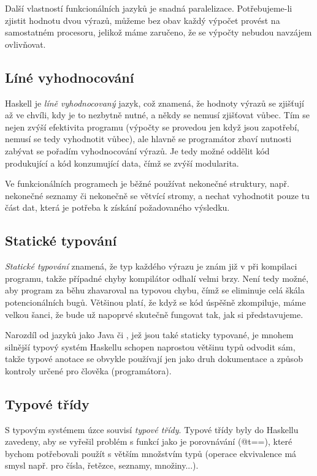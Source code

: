 Další vlastností funkcionálních jazyků je snadná paralelizace. Potřebujeme-li
zjistit hodnotu dvou výrazů, můžeme bez obav každý výpočet provést na
samostatném procesoru, jelikož máme zaručeno, že se výpočty nebudou navzájem
ovlivňovat.

\subsection{Líné vyhodnocování}

Haskell je \emph{líně vyhodnocovaný} jazyk, což znamená, že hodnoty výrazů se
zjišťují až ve chvíli, kdy je to nezbytně nutné, a někdy se nemusí zjišťovat
vůbec. Tím se nejen zvýší efektivita programu (výpočty se provedou jen když jsou
zapotřebí, nemusí se tedy vyhodnotit vůbec), ale hlavně se programátor zbaví
nutnosti zabývat se pořadím vyhodnocování výrazů. Je tedy možné oddělit kód
produkující a kód konzumující data, čímž se zvýší modularita. \cite{hughes1989functional}

Ve funkcionálních programech je běžné používat nekonečné struktury, např.
nekonečné seznamy či nekonečně se větvící stromy, a nechat vyhodnotit pouze tu
část dat, která je potřeba k získání požadovaného výsledku.

\subsection{Statické typování}

\emph{Statické typování} znamená, že typ každého výrazu je znám již v při
kompilaci programu, takže případné chyby kompilátor odhalí velmi brzy. Není tedy
možné, aby program za běhu zhavaroval na typovou chybu, čímž se eliminuje celá
škála potencionálních bugů. Většinou platí, že když se kód úspěšně zkompiluje,
máme velkou šanci, že bude už napoprvé skutečně fungovat tak, jak si
představujeme.

Narozdíl od jazyků jako Java či \Cplusplus, jež jsou také staticky typované, je
mnohem silnější typový systém Haskellu schopen naprostou většinu typů odvodit
sám, takže typové anotace se obvykle používají jen jako druh dokumentace a
způsob kontroly určené pro člověka (programátora).

\subsection{Typové třídy}

S typovým systémem úzce souvisí \emph{typové třídy}. Typové třídy byly do
Haskellu zavedeny, aby se vyřešil problém s  funkcí jako je
porovnávání (@t{==}), které bychom potřebovali použít s větším množstvím typů
(operace ekvivalence má smysl např. pro čísla, řetězce, seznamy, množiny...).

